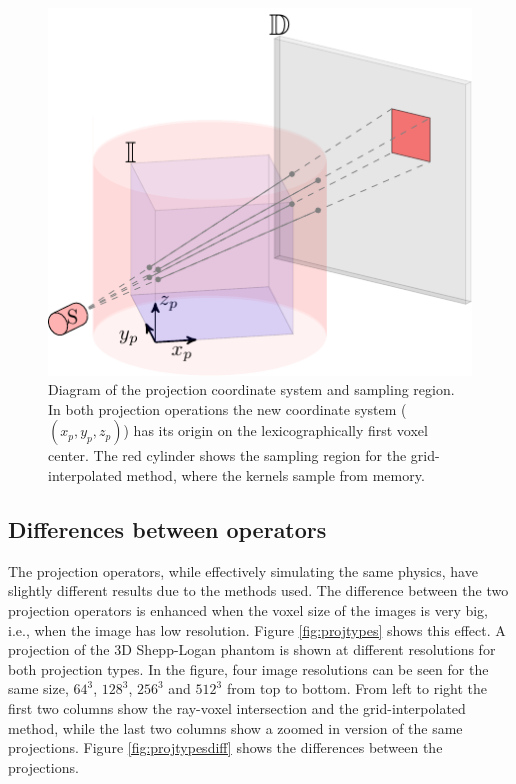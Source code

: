 \begin{figure}
\begin{center}

\includegraphics{GPUmethods/projcoord-figure0.pdf} 
\end{center}

\caption[Projection coordinate system]{\label{fig:projcoord} Diagram of the projection coordinate system and sampling region. In both projection operations the new coordinate system ($(x_p,y_p,z_p)$) has its origin on the lexicographically first voxel center. The red cylinder shows the sampling region for the grid-interpolated method, where the kernels sample from memory.} 
\end{figure}
\subsection{Differences between operators}

The projection operators, while effectively simulating the same physics, have slightly different results due to the methods used. The difference between the two projection operators is enhanced when the voxel size of the images is very big, i.e., when the image has low resolution. Figure \ref{fig:projtypes} shows this effect. A projection of the 3D Shepp-Logan phantom is shown at different resolutions for both projection types. In the figure, four image resolutions can be seen for the same size, $64^3$, $128^3$, $256^3$ and $512^3$ from top to bottom. From left to right the first two columns show the ray-voxel intersection and the grid-interpolated method, while the last two columns show a zoomed in version of the same projections. Figure \ref{fig:projtypesdiff} shows the differences between the projections.

